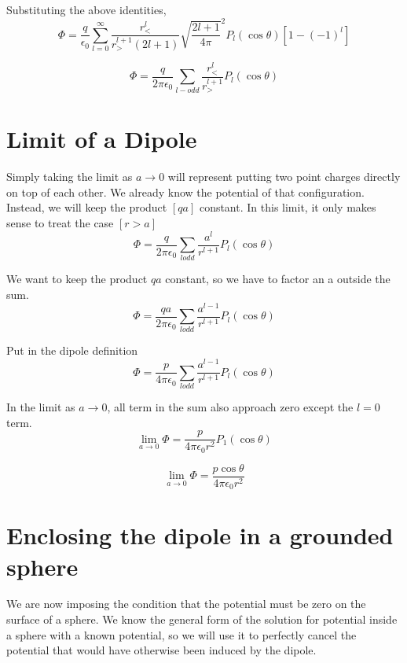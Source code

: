 \documentclass[10pt,a4paper]{article}
\begin{document}
Substituting the above identities,
\begin{equation}
\Phi=\frac{q}{\epsilon_0}\sum_{l=0}^\infty
\frac{r_<^l}{r_>^{l+1}(2l+1)}
\sqrt{\frac{2l+1}{4\pi}}^2P_l(\cos\theta)
\left[1-(-1)^l\right]
\end{equation}

\begin{equation}
\boxed{\Phi=\frac{q}{2\pi\epsilon_0}\sum_{l-odd}
\frac{r_<^l}{r_>^{l+1}}P_l(\cos\theta)}
\end{equation}

\section{Limit of a Dipole}
Simply taking the limit as $a\rightarrow0$ will represent putting two point charges directly on top of each other.  We already know the potential of that configuration.  Instead, we will  keep the product $[qa]$ constant.  In this limit, it only makes sense to treat the case $[r>a]$
\begin{equation}
\Phi=\frac{q}{2\pi\epsilon_0}\sum_{l odd}
\frac{a^l}{r^{l+1}}P_l(\cos\theta)
\end{equation}

We want to keep the product $qa$ constant, so we have to factor an a outside the sum.
\begin{equation}
\Phi=\frac{qa}{2\pi\epsilon_0}\sum_{l odd}
\frac{a^{l-1}}{r^{l+1}}P_l(\cos\theta)
\end{equation}

Put in the dipole definition
\begin{equation}
\Phi=\frac{p}{4\pi\epsilon_0}\sum_{l odd}
\frac{a^{l-1}}{r^{l+1}}P_l(\cos\theta)
\end{equation}

In the limit as $a\rightarrow0$, all term in the sum also approach zero except the $l=0$ term.
\begin{equation}
\lim_{a\rightarrow0}\Phi=\frac{p}{4\pi\epsilon_0r^2}P_1(\cos\theta)
\end{equation}

\begin{equation}
\boxed{\lim_{a\rightarrow0}\Phi=\frac{p\cos\theta}{4\pi\epsilon_0r^2}}
\end{equation}

\section{Enclosing the dipole in a grounded sphere}
We are now imposing the condition that the potential must be zero on the surface of a sphere.  We know the general form of the solution for potential inside a sphere with a known potential, so we will use it to perfectly cancel the potential that would have otherwise been induced by the dipole.
\end{document}
